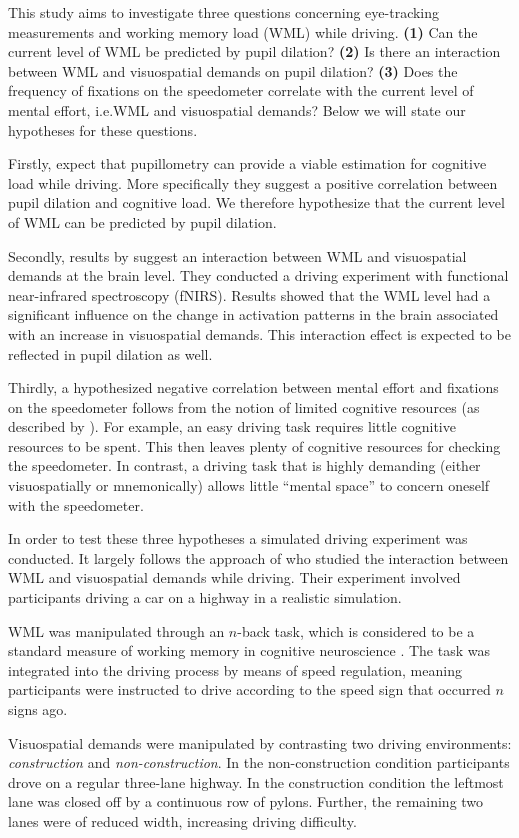 This study aims to investigate three questions concerning eye-tracking measurements and working memory load (WML) while driving.
\textbf{(1)} Can the current level of WML be predicted by pupil dilation?
\textbf{(2)} Is there an interaction between WML and visuospatial demands on pupil dilation?
\textbf{(3)} Does the frequency of fixations on the speedometer correlate with the current level of mental effort, i.e.\@ WML and visuospatial demands?
Below we will state our hypotheses for these questions. 

Firstly, \citet{Palinko2010} expect that pupillometry can provide a viable estimation for cognitive load while driving. 
More specifically they suggest a positive correlation between pupil dilation and cognitive load.
We therefore hypothesize that the current level of WML can be predicted by pupil dilation.

Secondly, results by \citet{Scheunemann2019} suggest an interaction between WML and visuospatial demands at the brain level. 
They conducted a driving experiment with functional near-infrared spectroscopy (fNIRS).
Results showed that the WML level had a significant influence on the change in activation patterns in the brain associated with an increase in visuospatial demands.
This interaction effect is expected to be reflected in pupil dilation as well.

Thirdly, a hypothesized negative correlation between mental effort and fixations on the speedometer follows from the notion of limited cognitive resources (as described by \citet{DeWaard1996}).
For example, an easy driving task requires little cognitive resources to be spent.
This then leaves plenty of cognitive resources for checking the speedometer.
In contrast, a driving task that is highly demanding (either visuospatially or mnemonically) allows little ``mental space'' to concern oneself with the speedometer.

In order to test these three hypotheses a simulated driving experiment was conducted.
It largely follows the approach of \citet{Scheunemann2019} who studied the interaction between WML and visuospatial demands while driving.
Their experiment involved participants driving a car on a highway in a realistic simulation. 

WML was manipulated through an \(n\)-back task, which is considered to be a standard measure of working memory in cognitive neuroscience \citep{Kane2007}.
The task was integrated into the driving process by means of speed regulation, meaning participants were instructed to drive according to the speed sign that occurred \(n\) signs ago.

Visuospatial demands were manipulated by contrasting two driving environments: \textit{construction} and \textit{non-construction}.
In the non-construction condition participants drove on a regular three-lane highway.
In the construction condition the leftmost lane was closed off by a continuous row of pylons.
Further, the remaining two lanes were of reduced width, increasing driving difficulty.